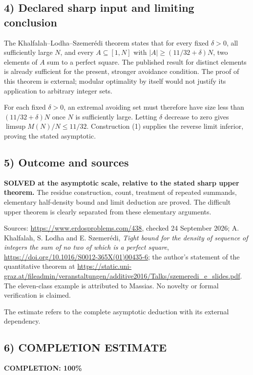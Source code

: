 \subsection*{4) Declared sharp input and limiting conclusion}
The Khalfalah--Lodha--Szemer\'edi theorem states that for every fixed $\delta>0$, all sufficiently large $N$, and every $A\subseteq[1,N]$ with $|A|\ge(11/32+\delta)N$, two elements of $A$ sum to a perfect square. The published result for distinct elements is already sufficient for the present, stronger avoidance condition. The proof of this theorem is external; modular optimality by itself would not justify its application to arbitrary integer sets.

For each fixed $\delta>0$, an extremal avoiding set must therefore have size less than $(11/32+\delta)N$ once $N$ is sufficiently large. Letting $\delta$ decrease to zero gives $\limsup M(N)/N\le11/32$. Construction (1) supplies the reverse limit inferior, proving the stated asymptotic.

\subsection*{5) Outcome and sources}
\textbf{SOLVED at the asymptotic scale, relative to the stated sharp upper theorem.} The residue construction, count, treatment of repeated summands, elementary half-density bound and limit deduction are proved. The difficult upper theorem is clearly separated from these elementary arguments.

Sources: \url{https://www.erdosproblems.com/438}, checked 24 September 2026; A. Khalfalah, S. Lodha and E. Szemer\'edi, \emph{Tight bound for the density of sequence of integers the sum of no two of which is a perfect square}, \url{https://doi.org/10.1016/S0012-365X(01)00435-6}; the author's statement of the quantitative theorem at \url{https://static.uni-graz.at/fileadmin/veranstaltungen/additive2016/Talks/szemeredi_e_slides.pdf}. The eleven-class example is attributed to Massias. No novelty or formal verification is claimed.

The estimate refers to the complete asymptotic deduction with its external dependency.
\subsection*{6) COMPLETION ESTIMATE}
\textbf{COMPLETION: 100\%}
